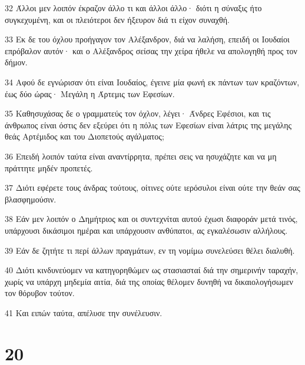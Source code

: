 \par 32 Άλλοι μεν λοιπόν έκραζον άλλο τι και άλλοι άλλο· διότι η σύναξις ήτο συγκεχυμένη, και οι πλειότεροι δεν ήξευρον διά τι είχον συναχθή.
\par 33 Εκ δε του όχλου προήγαγον τον Αλέξανδρον, διά να λαλήση, επειδή οι Ιουδαίοι επρόβαλον αυτόν· και ο Αλέξανδρος σείσας την χείρα ήθελε να απολογηθή προς τον δήμον.
\par 34 Αφού δε εγνώρισαν ότι είναι Ιουδαίος, έγεινε μία φωνή εκ πάντων των κραζόντων, έως δύο ώρας· Μεγάλη η Άρτεμις των Εφεσίων.
\par 35 Καθησυχάσας δε ο γραμματεύς τον όχλον, λέγει· Άνδρες Εφέσιοι, και τις άνθρωπος είναι όστις δεν εξεύρει ότι η πόλις των Εφεσίων είναι λάτρις της μεγάλης θεάς Αρτέμιδος και του Διοπετούς αγάλματος;
\par 36 Επειδή λοιπόν ταύτα είναι αναντίρρητα, πρέπει σεις να ησυχάζητε και να μη πράττητε μηδέν προπετές.
\par 37 Διότι εφέρετε τους άνδρας τούτους, οίτινες ούτε ιερόσυλοι είναι ούτε την θεάν σας βλασφημούσιν.
\par 38 Εάν μεν λοιπόν ο Δημήτριος και οι συντεχνίται αυτού έχωσι διαφοράν μετά τινός, υπάρχουσι δικάσιμοι ημέραι και υπάρχουσιν ανθύπατοι, ας εγκαλέσωσιν αλλήλους.
\par 39 Εάν δε ζητήτε τι περί άλλων πραγμάτων, εν τη νομίμω συνελεύσει θέλει διαλυθή.
\par 40 Διότι κινδυνεύομεν να κατηγορηθώμεν ως στασιασταί διά την σημερινήν ταραχήν, χωρίς να υπάρχη μηδεμία αιτία, διά της οποίας θέλομεν δυνηθή να δικαιολογήσωμεν τον θόρυβον τούτον.
\par 41 Και ειπών ταύτα, απέλυσε την συνέλευσιν.

\chapter{20}

